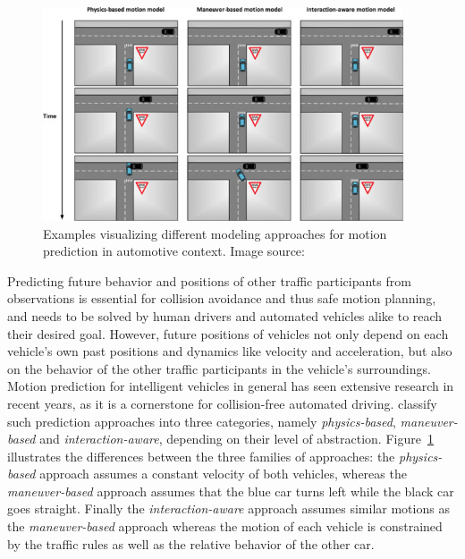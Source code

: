 \begin{figure}[t!]
	\centering
	\includegraphics[width=0.95\textwidth]{imgs/examples_motion_prediction_models.jpg}
	\caption{Examples visualizing different modeling approaches for motion prediction in automotive context. Image source: \textcite{Lefevre2014}}
	\label{fig:examples_motion_prediction_types}
\end{figure}

Predicting future behavior and positions of other traffic participants from observations is essential for collision avoidance and thus safe motion planning, and needs to be solved by human drivers and automated vehicles alike to reach their desired goal.
However, future positions of vehicles not only depend on each vehicle's own past positions and dynamics like  velocity and acceleration, but also on the behavior of the other traffic participants in the vehicle's surroundings.
Motion prediction for intelligent vehicles in general has seen extensive research in recent years, as it is a cornerstone for collision-free automated driving. 
\textcite{Lefevre2014} classify such prediction approaches into three categories, namely \emph{physics-based}, \emph{maneuver-based} and \emph{interaction-aware}, depending on their level of abstraction.
Figure~\ref{fig:examples_motion_prediction_types} illustrates the differences between the three families of approaches: the \emph{physics-based} approach assumes a constant velocity of both vehicles, whereas the \emph{maneuver-based} approach assumes that the blue car turns left while the black car goes straight.
Finally the \emph{interaction-aware} approach assumes similar motions as the \emph{maneuver-based} approach whereas the motion of each vehicle is constrained by the traffic rules as well as the relative behavior of the other car.

